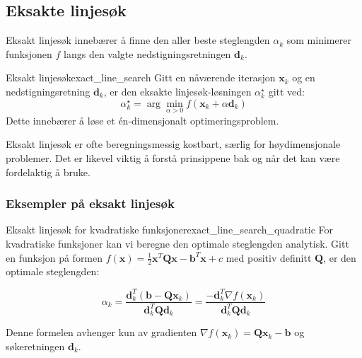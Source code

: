 \subsection{Eksakte linjesøk}
\label{subsec:exact_line_search}

Eksakt linjesøk innebærer å finne den aller beste steglengden \(\alpha_k\) som minimerer funksjonen \(f\) langs den valgte nedstigningsretningen \(\symbf{d}_k\).

\begin{definition}{Eksakt linjesøk}{exact_line_search}
	Gitt en nåværende iterasjon \(\symbf{x}_k\) og en nedstigningsretning \(\symbf{d}_k\), er den eksakte linjesøk-løsningen \(\alpha_k^\star\) gitt ved:
	\[
		\alpha_k^\star = \arg\min_{\alpha > 0} f(\symbf{x}_k + \alpha \symbf{d}_k)
	\]
	Dette innebærer å løse et én-dimensjonalt optimeringsproblem.
\end{definition}
Eksakt linjesøk er ofte beregningsmessig kostbart, særlig for høydimensjonale problemer. Det er likevel viktig å forstå prinsippene bak og når det kan være fordelaktig å bruke.

\subsubsection{Eksempler på eksakt linjesøk}
\label{subsubsec:exact_line_search_examples}

\begin{example}{Eksakt linjesøk for kvadratiske funksjoner}{exact_line_search_quadratic}
	For kvadratiske funksjoner kan vi beregne den optimale steglengden analytisk. Gitt en funksjon på formen 
	$f(\symbf{x}) = \frac{1}{2}\symbf{x}^T\symbf{Q}\symbf{x} - \symbf{b}^T\symbf{x} + c$ med positiv definitt $\symbf{Q}$, 
	er den optimale steglengden:

	\begin{equation*}
		\alpha_k = \frac{\symbf{d}_k^T(\symbf{b} - \symbf{Q}\symbf{x}_k)}{\symbf{d}_k^T\symbf{Q}\symbf{d}_k} = \frac{-\symbf{d}_k^T\nabla f(\symbf{x}_k)}{\symbf{d}_k^T\symbf{Q}\symbf{d}_k}
	\end{equation*}

	Denne formelen avhenger kun av gradienten $\nabla f(\symbf{x}_k) = \symbf{Q}\symbf{x}_k - \symbf{b}$ og 
	søkeretningen $\symbf{d}_k$.

	\begin{center}
	\end{center}
\end{example}


